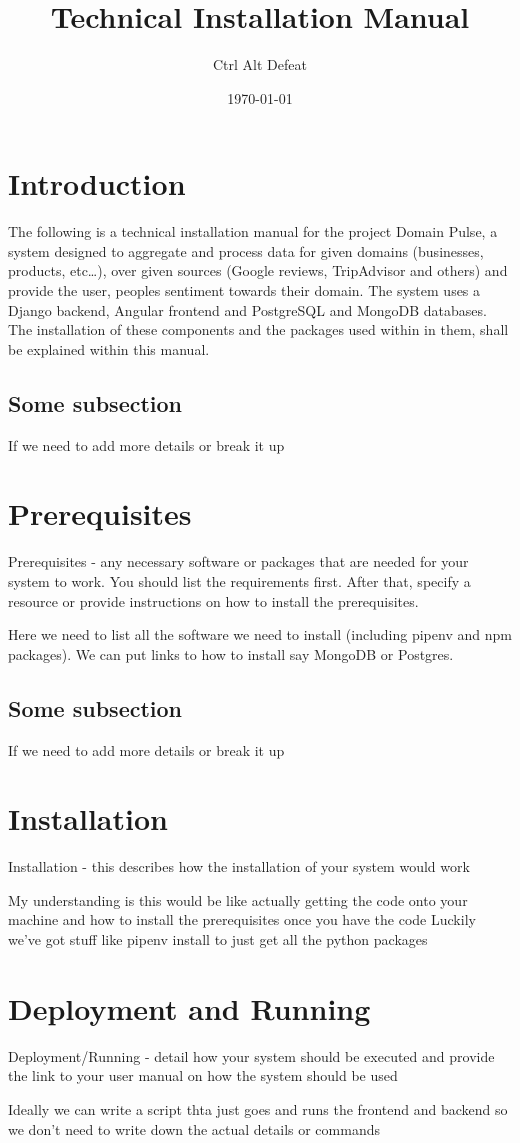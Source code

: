 \documentclass{article}
\title{Technical Installation Manual}
\author{Ctrl Alt Defeat}
\date{\today} %
\begin{document}
\maketitle %


\section{Introduction}
The following is a technical installation manual for the project Domain Pulse, a system designed to aggregate and
process data for given domains (businesses, products, etc…),
over given sources (Google reviews, TripAdvisor and others) and provide the user,
peoples sentiment towards their domain. The system uses a Django backend, Angular frontend and PostgreSQL and MongoDB databases.
The installation of these components and the packages used within in them, shall be explained within this manual.

\subsection{Some subsection}
If we need to add more details or break it up

\section{Prerequisites}
Prerequisites - any necessary software or packages that are needed for your system to work. You
should list the requirements first. After that, specify a resource or provide instructions on how to
install the prerequisites.

Here we need to list all the software we need to install (including pipenv and npm packages). We can put links to how to install say MongoDB or Postgres.

\subsection{Some subsection}
If we need to add more details or break it up


\section{Installation}
Installation - this describes how the installation of your system would work

My understanding is this would be like actually getting the code onto your machine and how to install the prerequisites once you have the code
Luckily we've got stuff like pipenv install to just get all the python packages


\section{Deployment and Running}
Deployment/Running - detail how your system should be executed and provide the link to your user
manual on how the system should be used

Ideally we can write a script thta just goes and runs the frontend and backend so we don't need to write down the actual details or commands
\end{document}
